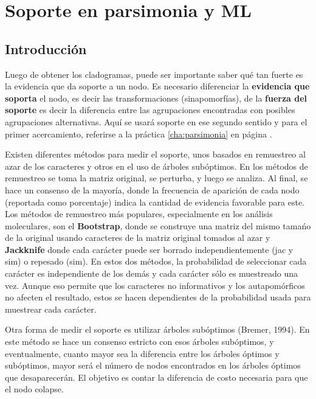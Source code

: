 \chapter{Soporte en parsimonia y ML}
\section*{Introducci\'on}

\label{ch:soporte.pars}
Luego de obtener los cladogramas, puede ser importante saber qu\'e tan fuerte es la evidencia que da soporte a un nodo. Es necesario diferenciar la \textbf{evidencia que soporta} el nodo, es decir las transformaciones (sinapomorf\'ias), de la \textbf{fuerza del soporte} es decir la diferencia entre las agrupaciones encontradas con posibles agrupaciones alternativas. Aqu\'i se usar\'a soporte en ese segundo sentido y para el primer acercamiento, referirse a la pr\'actica \ref{cha:parsimonia} en p\'agina \pageref{cha:parsimonia}.

Existen diferentes m\'etodos para medir el soporte, unos basados en remuestreo al azar de los caracteres y otros en el uso de \'arboles sub\'optimos. En los m\'etodos de remuestreo se toma la matriz original, se perturba, y luego se analiza. Al final, se hace un consenso de la mayor\'ia, donde la frecuencia de aparici\'on de cada nodo (reportada como porcentaje) indica la cantidad de evidencia favorable para este. Los m\'etodos de remuestreo m\'as populares, especialmente en los an\'alisis moleculares, son el \textbf{Bootstrap}, donde se construye una matriz del mismo tama\'no de la original usando caracteres de la matriz original tomados al azar y  \textbf{Jackknife} donde cada car\'acter puede ser borrado independientemente (jac y sim) o repesado (sim). En estos dos m\'etodos, la probabilidad de seleccionar cada car\'acter es independiente de los dem\'as y cada car\'acter s\'olo es muestreado una vez. Aunque eso permite que los caracteres no informativos y los autapom\'orficos no afecten el resultado, estos se hacen dependientes de la probabilidad usada para muestrear cada car\'acter.


Otra forma de medir el soporte es utilizar \'arboles sub\'optimos (Bremer, 1994). En este m\'etodo se hace un consenso estricto con esos \'arboles sub\'optimos, y eventualmente, cuanto mayor sea  la diferencia entre los \'arboles \'optimos y sub\'optimos, mayor ser\'a el n\'umero de nodos encontrados en los \'arboles \'optimos que desaparecer\'an. El objetivo es contar la diferencia de costo necesaria para que el nodo colapse.


